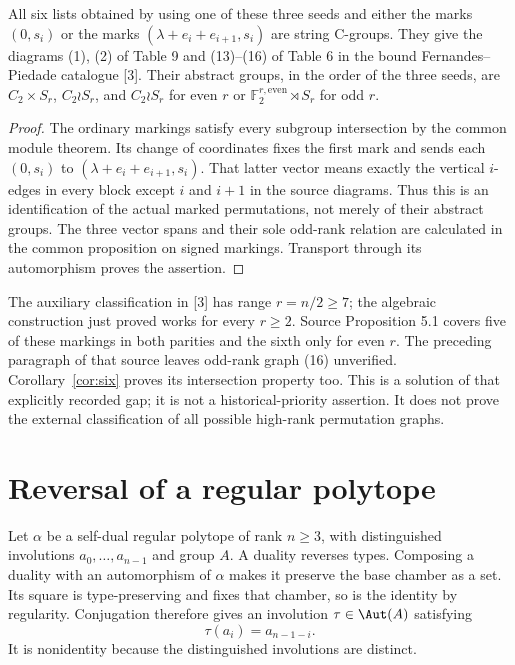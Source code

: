 \begin{corollary}\label{cor:six}
All six lists obtained by using one of these three seeds and either
the marks $(0,s_i)$ or the marks $(\lambda+e_i+e_{i+1},s_i)$ are
string C-groups. They give the diagrams (1), (2) of Table 9 and
(13)--(16) of Table 6 in the bound Fernandes--Piedade catalogue [3].
Their abstract groups, in the order of the three seeds, are
$C_2\times S_r$, $C_2\wr S_r$, and $C_2\wr S_r$ for even $r$ or
$\mathbb F_2^{r,\mathrm{even}}\rtimes S_r$ for odd $r$.
\end{corollary}
\begin{proof}
The ordinary markings satisfy every subgroup intersection by the common
module theorem. Its change of coordinates fixes the first mark and sends
each $(0,s_i)$ to $(\lambda+e_i+e_{i+1},s_i)$. That latter vector
means exactly the vertical $i$-edges in every block except $i$ and
$i+1$ in the source diagrams. Thus this is an identification of the
actual marked permutations, not merely of their abstract groups. The
three vector spans and their sole odd-rank relation are calculated in
the common proposition on signed markings. Transport through its
automorphism proves the assertion.
\end{proof}

The auxiliary classification in [3] has range $r=n/2\geq7$; the
algebraic construction just proved works for every $r\geq2$. Source
Proposition 5.1 covers five of these markings in both parities and the
sixth only for even $r$. The preceding paragraph of that source leaves
odd-rank graph (16) unverified. Corollary~\ref{cor:six} proves its
intersection property too. This is a solution of that explicitly recorded
gap; it is not a historical-priority assertion. It does not prove the
external classification of all possible high-rank permutation graphs.

\section{Reversal of a regular polytope}
Let $\alpha$ be a self-dual regular polytope of rank $n\geq3$, with
distinguished involutions $a_0,\ldots,a_{n-1}$ and group $A$. A duality
reverses types. Composing a duality with an automorphism of $\alpha$
makes it preserve the base chamber as a set. Its square is type-preserving
and fixes that chamber, so is the identity by regularity. Conjugation
therefore gives an involution $\tau\in\Aut(A)$ satisfying
\begin{equation}\label{eq:reversal}
 \tau(a_i)=a_{n-1-i}.
\end{equation}
It is nonidentity because the distinguished involutions are distinct.

